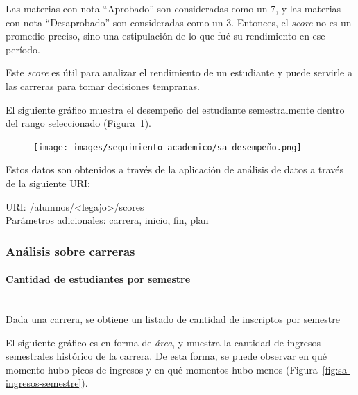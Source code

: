 Las materias con nota “Aprobado” son consideradas como un 7, y las materias con nota “Desaprobado” son consideradas como un 3. Entonces, el \textit{score} no es un promedio preciso, sino una estipulación de lo que fué su rendimiento en ese período.

Este \textit{score} es útil para analizar el rendimiento de un estudiante y puede servirle a las carreras para tomar decisiones tempranas.

El siguiente gráfico muestra el desempeño del estudiante semestralmente dentro del rango seleccionado  (Figura~\ref{fig:sa-desempenio}).
\begin{figure}[H]
  \centering
    \texttt{[image: images/seguimiento-academico/sa-desempeño.png]}
  \label{fig:sa-desempenio}
\end{figure}

Estos datos son obtenidos a través de la aplicación de análisis de datos a través de la siguiente URI:

URI: /alumnos/<legajo>/scores \\

Parámetros adicionales: carrera, inicio, fin, plan \\



\subsubsection{Análisis sobre carreras}

\paragraph{Cantidad de estudiantes por semestre}\mbox{}\\

Dada una carrera, se obtiene un listado de cantidad de inscriptos por semestre

El siguiente gráfico es en forma de \textit{área}, y muestra la cantidad de ingresos semestrales histórico de la carrera. De esta forma, se puede observar en qué momento hubo picos de ingresos y en qué momentos hubo menos (Figura~\ref{fig:sa-ingresos-semestre}).

